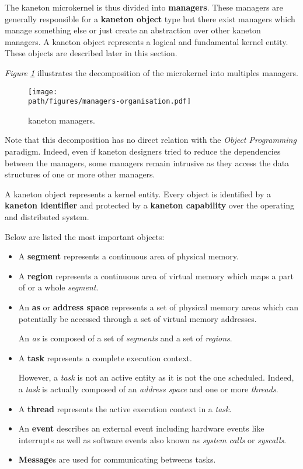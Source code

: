 The kaneton microkernel is thus divided into \textbf{managers}. These
managers are generally responsible for a \textbf{kaneton object} type but there
exist managers which manage something else or just create an abstraction over
other kaneton managers. A kaneton object represents a logical and fundamental
kernel entity. These objects are described later in this section.

\textit{Figure \ref{figure:managers-organisation}} illustrates the
decomposition of the microkernel into multiples managers.

\begin{figure}[h]
  \begin{center}
    \texttt{[image: \\path/figures/managers-organisation.pdf]}
    \caption{kaneton managers.}
    \label{figure:managers-organisation}
  \end{center}
\end{figure}

Note that this decomposition has no direct relation with the \textit{Object
Programming} paradigm. Indeed, even if kaneton designers tried to reduce the
dependencies between the managers, some managers remain intrusive as they
access the data structures of one or more other managers.

A kaneton object represents a kernel entity. Every object is identified by
a \textbf{kaneton identifier} and protected by a \textbf{kaneton capability}
over the operating and distributed system.

Below are listed the most important objects:

\begin{itemize}
  \item
    A \textbf{segment} represents a continuous area of physical memory.
  \item
    A \textbf{region} represents a continuous area of virtual memory which
    maps a part of or a whole \textit{segment}.
  \item
    An \textbf{as} or \textbf{address space} represents a set of physical
    memory areas which can potentially be accessed through a set of virtual
    memory addresses.

    \-

    An \textit{as} is composed of a set of \textit{segments} and a set of
    \textit{regions}.
  \item
    A \textbf{task} represents a complete execution context.

    \-

    However, a \textit{task} is not an active entity as it is not the
    one scheduled. Indeed, a \textit{task} is actually composed of an
    \textit{address space} and one or more \textit{threads}.
  \item
    A \textbf{thread} represents the active execution context in a
    \textit{task}.
  \item
    An \textbf{event} describes an external event including hardware
    events like interrupts as well as software events also known as
    \textit{system calls} or \textit{syscalls}.
  \item
    \textbf{Message}s are used for communicating betweens tasks.
\end{itemize}

